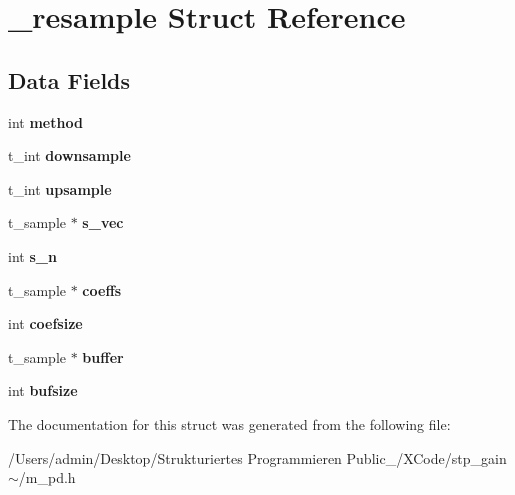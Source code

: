 \hypertarget{struct__resample}{}\section{\+\_\+resample Struct Reference}
\label{struct__resample}
\subsection*{Data Fields}
\begin{DoxyCompactItemize}
\item 
\mbox{\label{struct__resample_adcc9a19ad3119f823a658f6a49a24e64}} 
int {\bfseries method}
\item 
\mbox{\label{struct__resample_a557c02564a918ab46f10edfd7cf58c49}} 
t\+\_\+int {\bfseries downsample}
\item 
\mbox{\label{struct__resample_a8bd5117088d2fe0f7feca9bee53ca183}} 
t\+\_\+int {\bfseries upsample}
\item 
\mbox{\label{struct__resample_ad4ecec8b90444188a47a8cde0babc5ae}} 
t\+\_\+sample $\ast$ {\bfseries s\+\_\+vec}
\item 
\mbox{\label{struct__resample_aee0a45e5329caef59b617145b09fc3fa}} 
int {\bfseries s\+\_\+n}
\item 
\mbox{\label{struct__resample_a9c34ce6a37c6273044bd148d1b7e6298}} 
t\+\_\+sample $\ast$ {\bfseries coeffs}
\item 
\mbox{\label{struct__resample_a8ebe6d92ebeffa641883431e18e5fe2b}} 
int {\bfseries coefsize}
\item 
\mbox{\label{struct__resample_ad3f952f1432d55dde1e47bf4ed4296fb}} 
t\+\_\+sample $\ast$ {\bfseries buffer}
\item 
\mbox{\label{struct__resample_a199ab88d4ca8eab30e1cb7d35edacca5}} 
int {\bfseries bufsize}
\end{DoxyCompactItemize}


The documentation for this struct was generated from the following file\+:\begin{DoxyCompactItemize}
\item 
/\+Users/admin/\+Desktop/\+Strukturiertes Programmieren Public\+\_/\+X\+Code/stp\+\_\+gain$\sim$/m\+\_\+pd.\+h\end{DoxyCompactItemize}
